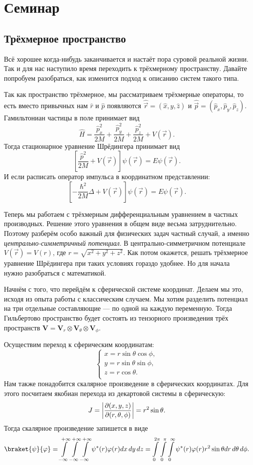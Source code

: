 \section{Семинар \thesection}
\subsection{Трёхмерное пространство}
Всё хорошее когда-нибудь заканчивается и настаёт пора суровой реальной жизни.
Так и для нас наступило время переходить к трёхмерному пространству. Давайте
попробуем разобраться, как изменится подход к описанию систем такого типа.

Так как пространство трёхмерное, мы рассматриваем трёхмерные операторы, то есть
вместо привычных нам $\hat{r}$ и $\hat{p}$ появляются $\hat{\Vec{r}} =
  (\hat{x}, \hat{y}, \hat{z})$ и $\hat{\Vec{p}} = (\hat{p}_x, \hat{p}_y,
  \hat{p}_z)$. Гамильтониан частицы в поле принимает вид
\[
  \hat{H} = \frac{\hat{p}^2_x}{2M} + \frac{\hat{p}^2_y}{2M} + \frac{\hat{p}^2_z}{2M} + V(\Vec{r}).
\]
Тогда стационарное уравнение Шрёдингера принимает вид
\[
  \left[\frac{\hat{p}^2}{2M} + V(\Vec{r})\right]\psi(\Vec{r}) = E\psi(\Vec{r}).
\]
И если расписать оператор импульса в координатном представлении:
\[
  \left[-\frac{\hbar^2}{2M}\Delta + V(\Vec{r})\right]\psi(\Vec{r}) = E\psi(\Vec{r}).
\]

Теперь мы работаем с трёхмерным дифференциальным уравнением в частных
производных. Решение этого уравнения в общем виде весьма затруднительно.
Поэтому разберём особо важный для физических задач частный случай, а именно
\textit{центрально-симметричный потенциал}. В центрально-симметричном
потенциале $V(\Vec{r}) = V(r)$, где $r = \sqrt{x^2 + y^2 + z^2}$. Как потом
окажется, решать трёхмерное уравнение Шрёдингера при таких условиях гораздо
удобнее. Но для начала нужно разобраться с математикой.

Начнём с того, что перейдём к сферической системе координат. Делаем мы это,
исходя из опыта работы с классическим случаем. Мы хотим разделить потенциал на
три отдельные составляющие --- по одной на каждую переменную. Тогда Гильбертово
пространство будет состоять из тензорного произведения трёх пространств
$\mathbf{V} = \mathbf{V}_r \otimes \mathbf{V}_{\theta} \otimes
  \mathbf{V}_{\phi}$.

Осуществим переход к сферическим координатам:
\[
  \begin{cases}
    x = r \sin \theta \cos \phi,\\
    y = r \sin \theta \sin \phi, \\
    z = r \cos \theta. \\
  \end{cases}
\]
Нам также понадобится скалярное произведение в сферических координатах. Для
этого посчитаем якобиан перехода из декартовой системы в сферическую:
\[
  J = \left|\frac{\partial (x, y, z)}{\partial (r, \theta, \phi)}\right| = r^2\sin\theta.
\]
Тогда скалярное произведение запишется в виде
\[
  \braket{\psi}{\varphi} = \int\limits_{-\infty}^{+\infty}\int\limits_{-\infty}^{+\infty}\int\limits_{-\infty}^{+\infty}\psi^*(r)\varphi(r)dx\,dy\,dz= \int\limits_0^{2\pi}\int\limits_0^{\pi}\int\limits_0^{\infty}\psi^*(r)\varphi(r)r^2\sin\theta dr \,d\theta\,d\phi.
\]

